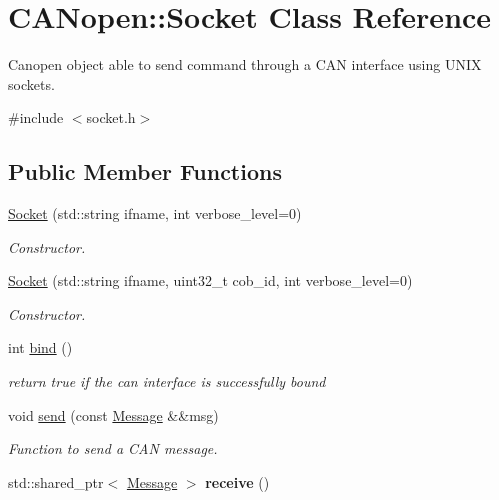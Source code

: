 \hypertarget{class_c_a_nopen_1_1_socket}{}\section{C\+A\+Nopen\+:\+:Socket Class Reference}
\label{class_c_a_nopen_1_1_socket}


Canopen object able to send command through a C\+AN interface using U\+N\+IX sockets.  




{\ttfamily \#include $<$socket.\+h$>$}

\subsection*{Public Member Functions}
\begin{DoxyCompactItemize}
\item 
\hyperlink{class_c_a_nopen_1_1_socket_a66c37f6819a5ad8829326380812446e6}{Socket} (std\+::string ifname, int verbose\+\_\+level=0)
\begin{DoxyCompactList}\small\item\em Constructor. \end{DoxyCompactList}\item 
\hyperlink{class_c_a_nopen_1_1_socket_af234eea5568f8f436cb815ab70e75f2f}{Socket} (std\+::string ifname, uint32\+\_\+t cob\+\_\+id, int verbose\+\_\+level=0)
\begin{DoxyCompactList}\small\item\em Constructor. \end{DoxyCompactList}\item 
\mbox{\label{class_c_a_nopen_1_1_socket_a6f63808addc451747608c21b958821f4}} 
int \hyperlink{class_c_a_nopen_1_1_socket_a6f63808addc451747608c21b958821f4}{bind} ()
\begin{DoxyCompactList}\small\item\em return true if the can interface is successfully bound \end{DoxyCompactList}\item 
void \hyperlink{class_c_a_nopen_1_1_socket_aa147801723e58f287d06b6df28837c44}{send} (const \hyperlink{class_c_a_nopen_1_1_message}{Message} \&\&msg)
\begin{DoxyCompactList}\small\item\em Function to send a C\+AN message. \end{DoxyCompactList}\item 
\mbox{\label{class_c_a_nopen_1_1_socket_a15363c054b276777b4290c91fd05edd5}} 
std\+::shared\+\_\+ptr$<$ \hyperlink{class_c_a_nopen_1_1_message}{Message} $>$ {\bfseries receive} ()
\end{DoxyCompactItemize}
